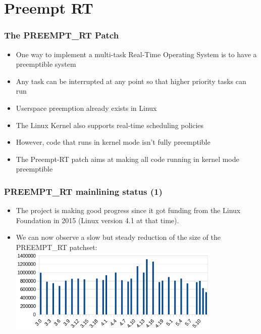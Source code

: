 \section{Preempt RT}

\begin{frame}
  \frametitle{The PREEMPT\_RT Patch}
	\begin{itemize}
		\item One way to implement a multi-task Real-Time Operating System is to have a preemptible system
		\item Any task can be interrupted at any point so that higher priority tasks can run
		\item Userspace preemption already exists in Linux
		\item The Linux Kernel also supports real-time scheduling policies
		\item However, code that runs in kernel mode isn't fully preemptible
		\item The Preempt-RT patch aims at making all code running in kernel mode preemptible
	\end{itemize}
\end{frame}

\begin{frame}
  \frametitle{PREEMPT\_RT mainlining status (1)}
  \begin{itemize}
  \item The project is making good progress since it got funding from
        the Linux Foundation in 2015 (Linux version 4.1 at that time).
  \item We can now observe a slow but steady reduction of the size of
        the PREEMPT\_RT patchset:\\
    \vfill
    \includegraphics[width=0.8\textwidth]{slides/realtime-linux-preempt-rt/rt-patch-sizes.png}
  \end{itemize}
\end{frame}

